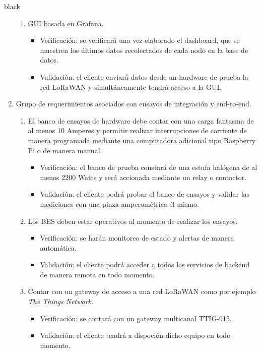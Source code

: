 \documentclass[11pt]{charter}
\begin{document}
\begin{consigna}{black}
\begin{enumerate}
\begin{enumerate}[label*=\arabic*.]
			\item GUI basada en Grafana.
			\begin{itemize}
				\item Verificación: se verificará una vez elaborado el dashboard, que se muestren los últimos datos recolectados de cada nodo en la base de datos.\\
				\item Validación: el cliente enviará datos desde un hardware de prueba la red LoRaWAN y simultáneamente tendrá acceso a la GUI.\\
			\end{itemize}
		\end{enumerate}
		
	\item Grupo de requerimientos asociados con ensayos de integración y end-to-end.
		\begin{enumerate}[label*=\arabic*.]
			\item El banco de ensayos de hardware debe contar con una carga fantasma de al menos
			10 Amperes y permitir realizar interrupciones de corriente de manera programada
			mediante una computadora adicional tipo Raspberry Pi o de manera manual.
			\begin{itemize}
				\item Verificación: el banco de prueba constará de una estufa halógena de al menos 2200 Watts y será accionada mediante un relay o contactor.\\
				\item Validación: el cliente podrá probar el banco de ensayos y validar las mediciones con una pinza amperométrica él mismo.\\
			\end{itemize}
			
			\item Los BES deben estar operativos al momento de realizar los ensayos.
			\begin{itemize}
				\item Verificación: se harán monitoreo de estado y alertas de manera automática.\\
				\item Validación: el cliente podrá acceder a todos los servicios de backend de manera remota en todo momento.\\
			\end{itemize}
			
			\item Contar con un gateway de acceso a una red LoRaWAN como por ejemplo \textit{The Things Network}.
			\begin{itemize}
				\item Verificación: se contará con un gateway multicanal TTIG-915.\\
				\item Validación: el cliente tendrá a dispoción dicho equipo en todo momento.\\
			\end{itemize}
		\end{enumerate}
\end{enumerate}

\end{consigna}
\end{document}
